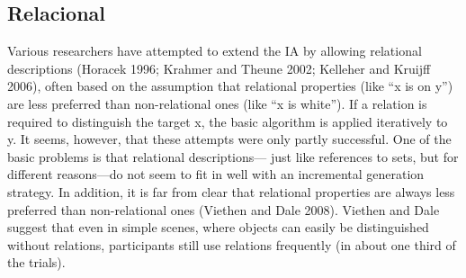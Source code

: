 %
%
%



%
%
%
%




\subsection{Relacional}

Various researchers have attempted to extend the IA by allowing relational descriptions
(Horacek 1996; Krahmer and Theune 2002; Kelleher and Kruijff 2006), often based
on the assumption that relational properties (like ``x is on y'') are less preferred than
non-relational ones (like ``x is white''). If a relation is required to distinguish the target
x, the basic algorithm is applied iteratively to y. It seems, however, that these attempts
were only partly successful. One of the basic problems is that relational descriptions—
just like references to sets, but for different reasons—do not seem to fit in well with an
incremental generation strategy. In addition, it is far from clear that relational properties
are always less preferred than non-relational ones (Viethen and Dale 2008). Viethen
and Dale suggest that even in simple scenes, where objects can easily be distinguished
without relations, participants still use relations frequently (in about one third of the
trials).

